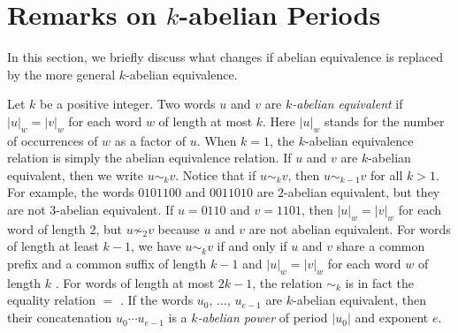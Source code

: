 \documentclass[a4paper,fleqn]{article}
\providecommand{\abs}[1]{\lvert#1\rvert}
\begin{document}
  \section{Remarks on \texorpdfstring{$k$}{k}-abelian Periods}\label{sec:k-abelian}
  In this section, we briefly discuss what changes if abelian equivalence is replaced by the more general $k$-abelian
  equivalence.

  Let $k$ be a positive integer. Two words $u$ and $v$ are \emph{$k$-abelian equivalent} if $\abs{u}_w = \abs{v}_w$ for
  each word $w$ of length at most $k$. Here $\abs{u}_w$ stands for the number of occurrences of $w$ as a factor of $u$.
  When $k = 1$, the $k$-abelian equivalence relation is simply the abelian equivalence relation. If $u$ and $v$ are
  $k$-abelian equivalent, then we write $u \sim_k v$. Notice that if $u \sim_k v$, then $u \sim_{k-1} v$ for all
  $k > 1$. For example, the words $0101100$ and $0011010$ are $2$-abelian equivalent, but they are not $3$-abelian
  equivalent. If $u = 0110$ and $v = 1101$, then $\abs{u}_w = \abs{v}_w$ for each word of length $2$, but
  $u \not\sim_2 v$ because $u$ and $v$ are not abelian equivalent. For words of length at least $k - 1$, we have
  $u \sim_k v$ if and only if $u$ and $v$ share a common prefix and a common suffix of length $k - 1$ and
  $\abs{u}_w = \abs{v}_w$ for each word $w$ of length $k$
  \cite[Lemma~2.4]{2013:on_a_generalization_of_abelian_equivalence_and_complexity_of_infinite}. For words of length at
  most $2k - 1$, the relation $\sim_k$ is in fact the equality relation $=$
  \cite[Lemma~2.4]{2013:on_a_generalization_of_abelian_equivalence_and_complexity_of_infinite}. If the words $u_0$,
  $\ldots$, $u_{e-1}$ are $k$-abelian equivalent, then their concatenation $u_0 \dotsm u_{e-1}$ is a \emph{$k$-abelian
  power} of period $\abs{u_0}$ and exponent $e$.
\end{document}

